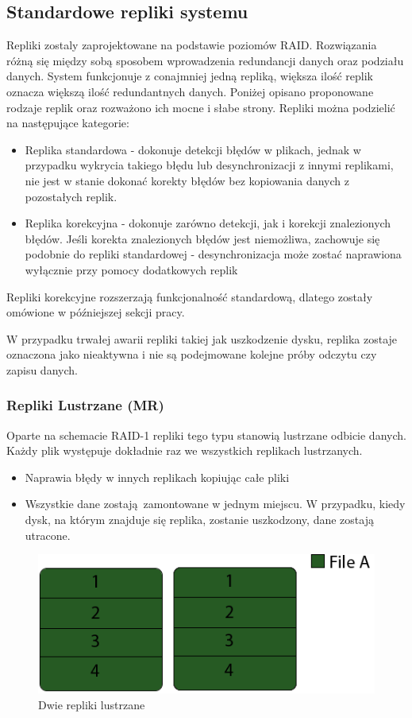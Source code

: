 \subsection{Standardowe repliki systemu}
Repliki zostaly zaprojektowane na podstawie poziomów RAID. Rozwiązania różną się 
między sobą sposobem wprowadzenia redundancji danych oraz podziału danych. 
System funkcjonuje z conajmniej jedną repliką, większa ilość replik oznacza większą ilość redundantnych danych. 
Poniżej opisano proponowane rodzaje replik oraz rozważono ich mocne i słabe strony. 
Repliki można podzielić na następujące kategorie:
\begin{itemize}
    \item Replika standardowa - dokonuje detekcji błędów w plikach, 
    jednak w przypadku wykrycia takiego błędu lub desynchronizacji z innymi replikami, 
    nie jest w stanie dokonać korekty błędów bez kopiowania danych z pozostałych replik.
    \item Replika korekcyjna - dokonuje zarówno detekcji, 
    jak i korekcji znalezionych błędów. 
    Jeśli korekta znalezionych błędów jest niemożliwa, zachowuje się 
    podobnie do repliki standardowej - desynchronizacja może zostać naprawiona wyłącznie 
    przy pomocy dodatkowych replik
\end{itemize}
Repliki korekcyjne rozszerzają funkcjonalność standardową, dlatego zostały omówione w późniejszej sekcji pracy. 

W przypadku trwałej awarii repliki takiej jak uszkodzenie dysku, replika zostaje oznaczona jako nieaktywna i nie są podejmowane kolejne próby odczytu czy zapisu danych.
\subsubsection{Repliki Lustrzane (MR)}
Oparte na schemacie RAID-1 repliki tego typu stanowią lustrzane odbicie danych. 
Każdy plik występuje dokładnie raz we wszystkich replikach lustrzanych.
\begin{itemize}
        \item Naprawia błędy w innych replikach kopiując całe pliki
        \item Wszystkie dane zostają zamontowane w jednym miejscu. 
        W przypadku, kiedy dysk, na którym znajduje się replika, zostanie uszkodzony, 
        dane zostają utracone.
\end{itemize}

\begin{figure}[h!]
        \centering
        \includegraphics{raid-1.png}
        \caption{Dwie repliki lustrzane}
        \label{fig:raid1}
\end{figure}

